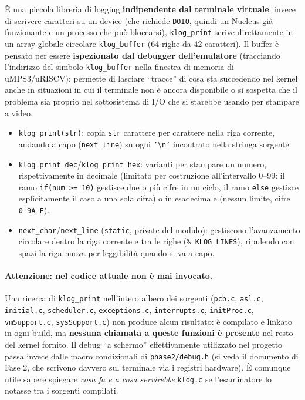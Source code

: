 \documentclass[11pt,a4paper]{article}
\newcommand{\code}[1]{\texttt{#1}}
\begin{document}
\`E una piccola libreria di logging \textbf{indipendente dal terminale
virtuale}: invece di scrivere caratteri su un device (che richiede
\code{DOIO}, quindi un Nucleus già funzionante e un processo che può
bloccarsi), \code{klog\_print} scrive direttamente in un array globale
circolare \code{klog\_buffer} (64 righe da 42 caratteri). Il buffer è
pensato per essere \textbf{ispezionato dal debugger dell'emulatore}
(tracciando l'indirizzo del simbolo \code{klog\_buffer} nella finestra di
memoria di uMPS3/uRISCV): permette di lasciare ``tracce'' di cosa sta
succedendo nel kernel anche in situazioni in cui il terminale non è ancora
disponibile o si sospetta che il problema sia proprio nel sottosistema di
I/O che si starebbe usando per stampare a video.
\begin{itemize}
\item \code{klog\_print(str)}: copia \code{str} carattere per carattere nella
  riga corrente, andando a capo (\code{next\_line}) su ogni
  \code{'\textbackslash n'} incontrato nella stringa sorgente.
\item \code{klog\_print\_dec}/\code{klog\_print\_hex}: varianti per stampare
  un numero, rispettivamente in decimale (limitato per costruzione
  all'intervallo 0--99: il ramo \code{if(num >= 10)} gestisce due o più
  cifre in un ciclo, il ramo \code{else} gestisce esplicitamente il caso a
  una sola cifra) o in esadecimale (nessun limite, cifre \code{0-9A-F}).
\item \code{next\_char}/\code{next\_line} (\code{static}, private del
  modulo): gestiscono l'avanzamento circolare dentro la riga corrente e tra
  le righe (\code{\% KLOG\_LINES}), ripulendo con spazi la riga nuova per
  leggibilità quando si va a capo.
\end{itemize}

\paragraph{Attenzione: nel codice attuale non è mai invocato.} Una ricerca
di \code{klog\_print} nell'intero albero dei sorgenti (\code{pcb.c},
\code{asl.c}, \code{initial.c}, \code{scheduler.c}, \code{exceptions.c},
\code{interrupts.c}, \code{initProc.c}, \code{vmSupport.c},
\code{sysSupport.c}) non produce alcun risultato: è compilato e linkato in
ogni build, ma \textbf{nessuna chiamata a queste funzioni è presente} nel
resto del kernel fornito. Il debug ``a schermo'' effettivamente utilizzato
nel progetto passa invece dalle macro condizionali di
\code{phase2/debug.h} (si veda il documento di Fase 2, che scrivono davvero
sul terminale via i registri hardware). \`E
comunque utile sapere spiegare \emph{cosa fa e a cosa servirebbe}
\code{klog.c} se l'esaminatore lo notasse tra i sorgenti compilati.
\end{document}
